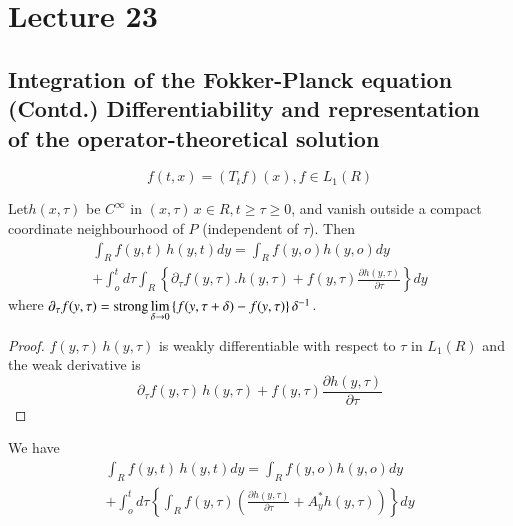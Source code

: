 \chapter{Lecture 23}\label{chap23} 

\section[Integration of the Fokker-Planck equation (Contd.) ....]{Integration of the Fokker-Planck equation\\ (Contd.)
  Differentiability and representation\\ of the
 operator-theoretical solution}\label{chap23:sec1}  
$$
f(t,x) = (T_t f) (x), f \in L_1 (R)
$$
\begin{lemma}\label{chap23:sec1:lem1}  %
 Let\pageoriginale $h(x, \tau)$ be $C^\infty$ in $(x, \tau)\, x \in R, t \ge \tau \ge
 0$, and vanish outside a compact coordinate neighbourhood of $P$
 (independent of $\tau$). Then 
 \begin{multline*}
  \int_R f(y, t)\, h( y,t) dy = \int_R f(y,o) h(y,o) dy \\
  + \int^t_o d \tau \int_R \left\{ \partial_\tau f(y, \tau). h (y,
  \tau) +f(y, \tau ) \frac{\partial h(y, \tau )}{\partial \tau}
  \right\} dy 
 \end{multline*}
 where $\partial_\tau f(y, \tau) =\operatorname*{strong} \lim\limits_{\delta \to 0}
 \left\{ f(y, \tau + \delta ) - f (y, \tau ) \right\} \delta^{-1}$. 
\end{lemma}

\begin{proof}
 $f(y, \tau)\, h(y, \tau)$ is weakly differentiable with respect to
 $\tau$ in $L_1(R)$ and the weak derivative is 
 $$
 \partial_\tau f(y, \tau)\, h(y, \tau) + f(y, \tau) \frac{\partial h
  (y, \tau)}{\partial \tau} 
 $$
\end{proof}

\eject

\begin{coro*}%
 We have 
 \begin{multline*}
  \int_R f(y,t)\, h(y,t) dy = \int_R f(y,o) h(y,o) dy \\
  + \int^t_o d \tau \left\{\int_R f(y, \tau) \left( \frac{\partial
   h (y, \tau )}{\partial \tau }+ A^*_y h(y, \tau ) \right)\right\}
  dy 
 \end{multline*}
\end{coro*}

